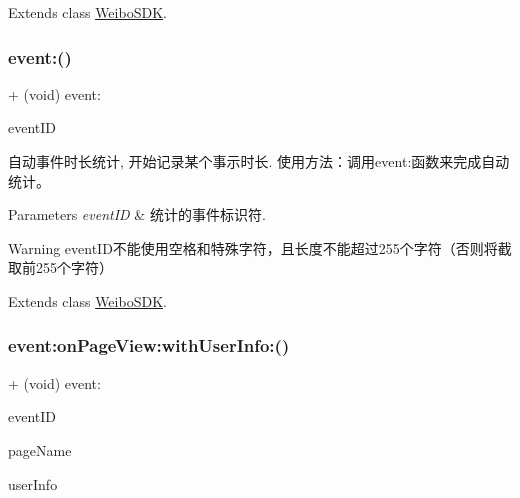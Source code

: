 Extends class \mbox{\hyperlink{interface_weibo_s_d_k_af035b5557e6dd544e282689323d8c4aa}{Weibo\+S\+DK}}.

\mbox{\label{category_weibo_s_d_k_07_statistics_08_af035b5557e6dd544e282689323d8c4aa}} 
\subsubsection{\texorpdfstring{event\+:()}{event:()}\hspace{0.1cm}{\footnotesize\ttfamily [3/3]}}
{\footnotesize\ttfamily + (void) event\+: \begin{DoxyParamCaption}\item[{(N\+S\+String $\ast$)}]{event\+ID }\end{DoxyParamCaption}}

自动事件时长统计, 开始记录某个事示时长. 使用方法：调用event\+:函数来完成自动统计。 
\begin{DoxyParams}{Parameters}
{\em event\+ID} & 统计的事件标识符. \\
\hline
\end{DoxyParams}
\begin{DoxyWarning}{Warning}
event\+I\+D不能使用空格和特殊字符，且长度不能超过255个字符（否则将截取前255个字符） 
\end{DoxyWarning}


Extends class \mbox{\hyperlink{interface_weibo_s_d_k_af035b5557e6dd544e282689323d8c4aa}{Weibo\+S\+DK}}.

\mbox{\label{category_weibo_s_d_k_07_statistics_08_a7c433640d9ed0d396166f2777a428277}} 
\subsubsection{\texorpdfstring{event\+:on\+Page\+View\+:with\+User\+Info\+:()}{event:onPageView:withUserInfo:()}\hspace{0.1cm}{\footnotesize\ttfamily [1/3]}}
{\footnotesize\ttfamily + (void) event\+: \begin{DoxyParamCaption}\item[{(N\+S\+String $\ast$)}]{event\+ID }\item[{onPageView:(N\+S\+String $\ast$)}]{page\+Name }\item[{withUserInfo:(N\+S\+Dictionary $\ast$)}]{user\+Info }\end{DoxyParamCaption}}

